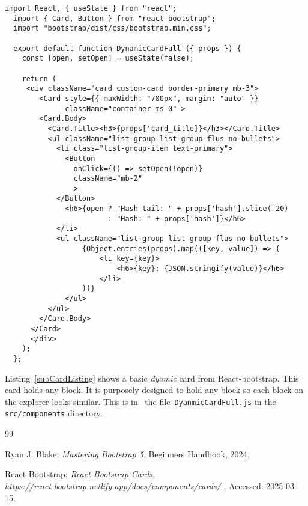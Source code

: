 \documentclass[12pt]{article}
\begin{document}
%
%
\pagebreak
%
%
%
\begin{lstlisting}[label=subCardListing,style=JSES6Base, caption={Basic Dynamic Card for a Stacks block}]
  import React, { useState } from "react";
  import { Card, Button } from "react-bootstrap";
  import "bootstrap/dist/css/bootstrap.min.css";
  
  export default function DynamicCardFull ({ props }) {
    const [open, setOpen] = useState(false);
  
    return (
     <div className="card custom-card border-primary mb-3">
        <Card style={{ maxWidth: "700px", margin: "auto" }} 
              className="container ms-0" >
        <Card.Body>
          <Card.Title><h3>{props['card_title]}</h3></Card.Title>
          <ul className="list-group list-group-flus no-bullets">
            <li class="list-group-item text-primary">
              <Button
                onClick={() => setOpen(!open)}
                className="mb-2"
                >
            </Button>
              <h6>{open ? "Hash tail: " + props['hash'].slice(-20) 
                        : "Hash: " + props['hash']}</h6>
            </li>
            <ul className="list-group list-group-flus no-bullets">
                  {Object.entries(props).map(([key, value]) => (
                      <li key={key}>
                          <h6>{key}: {JSON.stringify(value)}</h6>
                      </li>
                  ))}
              </ul>
          </ul>
        </Card.Body>
      </Card>
      </div>
    );
  };
\end{lstlisting}

Listing~\ref{subCardListing} shows a basic {\em dyamic} card from React-bootstrap.
This card holds any block. 
It is purposely designed to hold any block so each block on the explorer looks similar.
This is in~ the file~\lstinline[language=bash]|DyanmicCardFull.js| in the \lstinline[language=bash]|src/components| directory.




%
%
%
%
\begin {thebibliography}{99}
%



 Ryan J. Blake:
	      {\em Mastering Bootstrap 5},
	     Beginners Handbook,
       2024.

       
 React Bootstrap:
        {\em React Bootstrap Cards},\\
        {\em https://react-bootstrap.netlify.app/docs/components/cards/ },
       Accessed: 2025-03-15.

\end {thebibliography}
\end{document}
